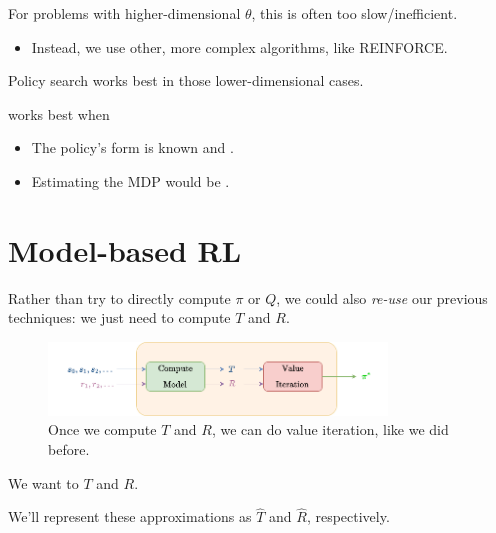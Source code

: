         For problems with higher-dimensional $\theta$, this is often too slow/inefficient.

        \begin{itemize}
            \item Instead, we use other, more complex algorithms, like REINFORCE.
        \end{itemize}

        Policy search works best in those lower-dimensional cases.\\

        \begin{concept}
             works best when 

            \begin{itemize}
                \item The policy's  form is known and .
                \item Estimating the MDP would be .
            \end{itemize}
        \end{concept}



\pagebreak

\section{Model-based RL}

    Rather than try to directly compute $\pi$ or $Q$, we could also \textit{re-use} our previous techniques: we just need to compute $T$ and $R$.

    \begin{figure}[H]
        \centering
        \includegraphics[width=90mm,scale=0.5]{images/rl_images/model_based.png}
        \caption*{Once we compute $T$ and $R$, we can do value iteration, like we did before.}
    \end{figure}

    \begin{notation}
        We want to  $T$ and $R$.

        We'll represent these approximations as $\widehat{T}$ and $\widehat{R}$, respectively.
    \end{notation}


